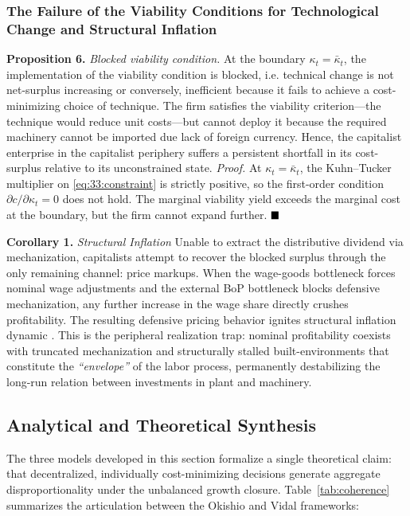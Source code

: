 \subsubsection{The Failure of the Viability Conditions for Technological Change and Structural Inflation}

\textbf{Proposition 6.} \textit{Blocked viability condition.}
At the boundary $\kappa_t = \bar{\kappa}_t$, the
implementation of the viability condition is blocked, i.e. technical change is not net-surplus increasing or conversely, inefficient because it fails to achieve a cost-minimizing choice of technique. The firm satisfies the viability criterion---the technique would reduce unit costs---but cannot deploy it because the required machinery cannot be imported due lack of foreign currency. Hence, the capitalist enterprise in the capitalist periphery suffers a persistent shortfall in its cost-surplus
relative to its unconstrained state.
\textit{Proof.} At $\kappa_t = \bar{\kappa}_t$, the
Kuhn--Tucker multiplier on \eqref{eq:33:constraint} is
strictly positive, so the first-order condition
$\partial c / \partial \kappa_t = 0$ does not hold. The
marginal viability yield exceeds the marginal cost at the
boundary, but the firm cannot expand further.
$\hfill\blacksquare$


\textbf{Corollary 1.} \textit{Structural Inflation} Unable to extract the distributive dividend via mechanization, capitalists attempt to recover the blocked surplus through the only remaining channel: price markups. When the wage-goods bottleneck forces nominal wage adjustments and the external BoP
bottleneck blocks defensive mechanization, any further increase
in the wage share directly crushes profitability. The resulting
defensive pricing behavior ignites structural inflation
dynamic \citep{Kalecki1955, Sunkel1958, Prebisch1981}. This is the
peripheral realization trap: nominal profitability coexists
with truncated mechanization and structurally stalled built-environments that constitute the \textit{``envelope''} of the labor process,
permanently destabilizing the long-run relation between investments in plant 
and machinery.


\subsection{Analytical and Theoretical Synthesis}

The three models developed in this section formalize a single
theoretical claim: that decentralized, individually
cost-minimizing decisions generate aggregate
disproportionality under the unbalanced growth closure.
Table~\ref{tab:coherence} summarizes the articulation
between the Okishio and Vidal frameworks: 

